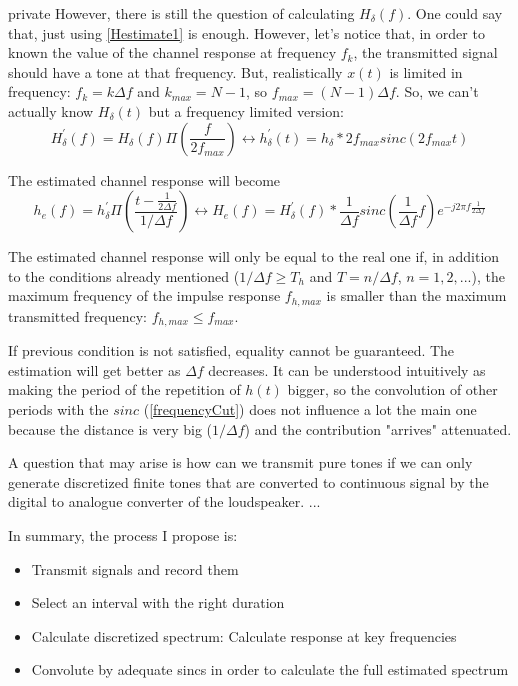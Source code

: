 \begin{shownto}{private}
However, there is still the question of calculating $H_\delta(f)$. One could say that, just using \autoref{Hestimate1} is enough. However, let's notice that, in order to known the value of the channel response at frequency $f_k$, the transmitted signal should have a tone at that frequency. But, realistically $x(t)$ is limited in frequency: $f_k = k\Delta f$ and $k_{max} = N - 1$, so $f_\mathit{max} = (N-1)\Delta f$. So, we can't actually know $H_\delta(t)$ but a frequency limited version:
\begin{equation}
H_\delta^{'}(f) = H_\delta(f) \Pi\left(\frac{f}{2 f_\mathit{max}}\right) \leftrightarrow h_\delta^{'}(t) = h_\delta \ast 2f_\mathit{max} \mathit{sinc}\left(  2f_\mathit{max} t \right)
\label{frequencyCut}
\end{equation}

The estimated channel response will become
\begin{equation}
h_e(f) = h_\delta^{'} \Pi\left( \frac{t - \frac{1}{2\Delta f}}{1/\Delta f} \right) \leftrightarrow
H_e(f) = H_\delta^{'}(f) \ast \frac{1}{\Delta f} \mathit{sinc}\left( \frac{1}{\Delta f} f \right) e^{-j 2 \pi f \frac{1}{2 \Delta f}}
\end{equation}

The estimated channel response will only be equal to the real one if, in addition to the conditions already mentioned ($1/\Delta f \geq T_h$ and $T = n/\Delta f$, $n = 1, 2, ...$), the maximum frequency of the impulse response $f_{h,max}$ is smaller than the maximum transmitted frequency: $f_{h,max} \leq f_{max}$.

If previous condition is not satisfied, equality cannot be guaranteed. The estimation will get better as $\Delta f$ decreases. It can be understood intuitively as making the period of the repetition of $h(t)$ bigger, so the convolution of other periods with the $\mathit{sinc}$ (\autoref{frequencyCut}) does not influence a lot the main one because the distance is very big ($1/\Delta f$) and the contribution "arrives" attenuated.

A question that may arise is how can we transmit pure tones if we can only generate discretized finite tones that are converted to continuous signal by the digital to analogue converter of the loudspeaker.
...

In summary, the process I propose is:
\begin{itemize}
	\item Transmit signals and record them
	\item Select an interval with the right duration
	\item Calculate discretized spectrum: Calculate response at key frequencies
	\item Convolute by adequate sincs in order to calculate the full estimated spectrum
\end{itemize}
\end{shownto}

